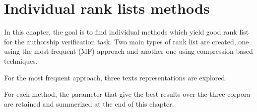 \section{Individual rank lists methods}

In this chapter, the goal is to find individual methods which yield good rank list for the authorship verification task.
Two main types of rank list are created, one using the most frequent (MF) approach and another one using compression based techniques.

For the most frequent approach, three texts representations are explored.

For each method, the parameter that give the best results over the three corpora are retained and summerized at the end of this chapter.







